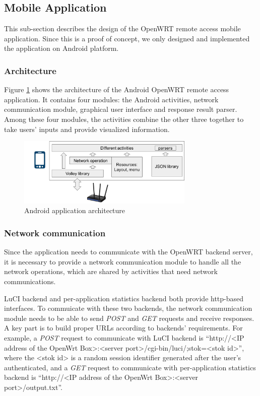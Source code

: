 \subsection{Mobile Application}
This sub-section describes the design of the OpenWRT remote access mobile application. Since this is a proof of concept, we only designed and implemented the application on Android platform.

\subsubsection{Architecture}
Figure \ref{android-architecture} shows the architecture of the Android OpenWRT remote access application. It contains four modules: the Android activities, network communication module, graphical user interface and response result parser. Among these four modules, the activities combine the other three together to take users' inputs and provide visualized information.

\begin{figure}
	\centering
	\includegraphics[width=0.75\textwidth]{android-architecture.png}
	\caption{Android application architecture}
	\label{android-architecture}
\end{figure}

\subsubsection{Network communication}
Since the application needs to communicate with the OpenWRT backend server, it is necessary to provide a network communication module to handle all the network operations, which are shared by activities that need network communications.

LuCI backend and per-application statistics backend both provide http-based interfaces. To commuicate with these two backends, the network communication module needs to be able to send \textit{POST} and \textit{GET} requests and receive responses. A key part is to build proper URLs according to backends' requirements. For example, a \textit{POST} request to communicate with LuCI backend is ``http://<IP address of the OpenWrt Box>:<server port>/cgi-bin/luci/;stok=<stok id>'', where the <stok id> is a random session identifier generated after the user's authenticated, and a \textit{GET} request to communicate with per-application statistics backend is ``http://<IP address of the OpenWrt Box>:<server port>/output.txt''.

